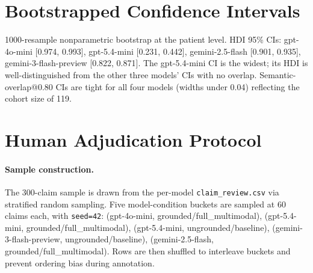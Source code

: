 \documentclass[11pt]{article}
\begin{document}
\section{Bootstrapped Confidence Intervals}
\label{app:bootstrap}

1000-resample nonparametric bootstrap at the patient level. HDI 95\% CIs: gpt-4o-mini [0.974, 0.993], gpt-5.4-mini [0.231, 0.442], gemini-2.5-flash [0.901, 0.935], gemini-3-flash-preview [0.822, 0.871]. The gpt-5.4-mini CI is the widest; its HDI is well-distinguished from the other three models' CIs with no overlap. Semantic-overlap@0.80 CIs are tight for all four models (widths under 0.04) reflecting the cohort size of 119.

\section{Human Adjudication Protocol}
\label{app:adjudication}

\paragraph{Sample construction.} The 300-claim sample is drawn from the per-model \texttt{claim\_review.csv} via stratified random sampling. Five model-condition buckets are sampled at 60 claims each, with \texttt{seed=42}: (gpt-4o-mini, grounded/full\_multimodal), (gpt-5.4-mini, grounded/full\_multimodal), (gpt-5.4-mini, ungrounded/baseline), (gemini-3-flash-preview, ungrounded/baseline), (gemini-2.5-flash, grounded/full\_multimodal). Rows are then shuffled to interleave buckets and prevent ordering bias during annotation.
\end{document}
